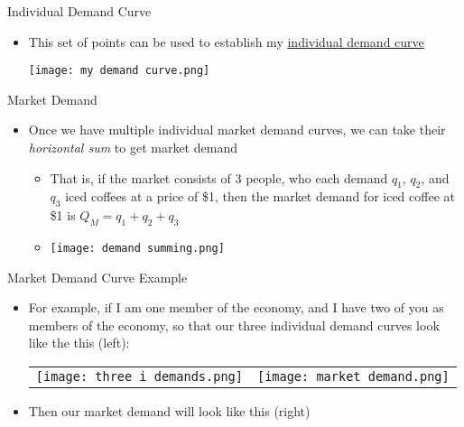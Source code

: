 \documentclass[10pt,xcolor={svgnames}]{beamer}
\begin{document}
\begin{frame}{Individual Demand Curve}
    \begin{itemize}
        \item This set of points can be used to establish my \underline{individual demand curve}
        \begin{center}
            \texttt{[image: my demand curve.png]}
        \end{center}
    \end{itemize}
\end{frame}

\begin{frame}{Market Demand}
    \begin{itemize}[<+->]
        \item Once we have multiple individual market demand curves, we can take their \textit{horizontal sum} to get market demand
        \begin{itemize}
            \item That is, if the market consists of 3 people, who each demand $q_{1}$, $q_{2}$, and $q_{3}$ iced coffees at a price of \$1, then the market demand for iced coffee at \$1 is $Q_{M}=q_{1}+q_{2}+q_{3}$
            \item
            \begin{center}
                \texttt{[image: demand summing.png]}
            \end{center}
        \end{itemize}
    \end{itemize}
\end{frame}

\begin{frame}{Market Demand Curve Example}
    \begin{itemize}[<+->]
        \item For example, if I am one member of the economy, and I have two of you as members of the economy, so that our three individual demand curves look like the this (left):
        \begin{table}[H]
            \centering
            \begin{tabular}{ll}
                \hspace{-18mm}\texttt{[image: three i demands.png]} & \pause \texttt{[image: market demand.png]}  
            \end{tabular}
        \end{table}
        \item<2-> Then our market demand will look like this (right)
    \end{itemize}
\end{frame}
\end{document}

